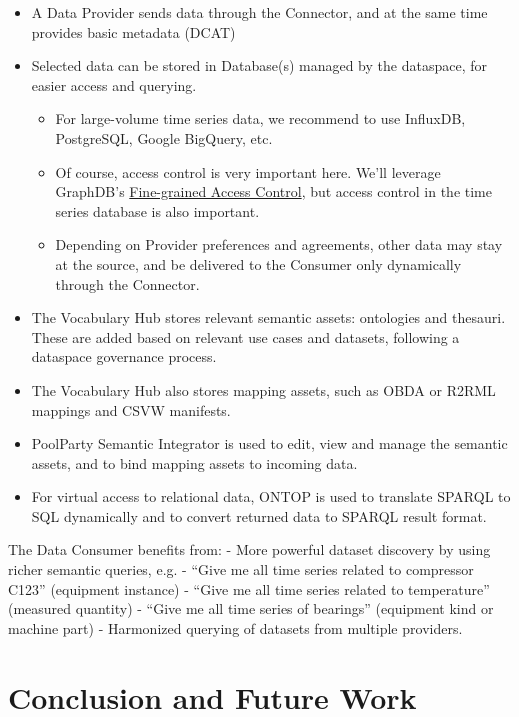 \documentclass[
  super,
  preprint,
  3p]{elsarticle}
\providecommand{\tightlist}{%
  \setlength{\itemsep}{0pt}\setlength{\parskip}{0pt}}\usepackage{longtable,booktabs,array}
\begin{document}
\begin{itemize}
\tightlist
\item
  A Data Provider sends data through the Connector, and at the same time
  provides basic metadata (DCAT)
\item
  Selected data can be stored in Database(s) managed by the dataspace,
  for easier access and querying.

  \begin{itemize}
  \tightlist
  \item
    For large-volume time series data, we recommend to use InfluxDB,
    PostgreSQL, Google BigQuery, etc.
  \item
    Of course, access control is very important here. We'll leverage
    GraphDB's
    \href{https://graphdb.ontotext.com/documentation/10.6/fine-grained-access-control.html}{Fine-grained
    Access Control}, but access control in the time series database is
    also important.
  \item
    Depending on Provider preferences and agreements, other data may
    stay at the source, and be delivered to the Consumer only
    dynamically through the Connector.
  \end{itemize}
\item
  The Vocabulary Hub stores relevant semantic assets: ontologies and
  thesauri. These are added based on relevant use cases and datasets,
  following a dataspace governance process.
\item
  The Vocabulary Hub also stores mapping assets, such as OBDA or R2RML
  mappings and CSVW manifests.
\item
  PoolParty Semantic Integrator is used to edit, view and manage the
  semantic assets, and to bind mapping assets to incoming data.
\item
  For virtual access to relational data, ONTOP is used to translate
  SPARQL to SQL dynamically and to convert returned data to SPARQL
  result format.
\end{itemize}

The Data Consumer benefits from: - More powerful dataset discovery by
using richer semantic queries, e.g. - ``Give me all time series related
to compressor C123'' (equipment instance) - ``Give me all time series
related to temperature'' (measured quantity) - ``Give me all time series
of bearings'' (equipment kind or machine part) - Harmonized querying of
datasets from multiple providers.

\section{Conclusion and Future Work}\label{conclusion-and-future-work}
\end{document}
